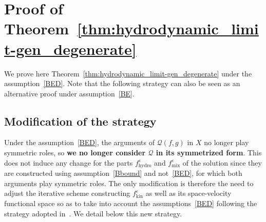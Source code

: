 \documentclass[10pt]{amsart}
\theoremstyle{definition}\newtheorem{defi}[theo]{Definition}\newtheorem{rema}[theo]{Remark}\newtheorem{exam}[theo]{Example}\newtheorem{exem}[theo]{Example}\newtheorem{nota}[theo]{Notation}
\newcommand{\hyd}{\mathrm{hydro}}
\newcommand{\mix}{\mathrm{mix}}
\newcommand{\kin}{\mathrm{kin}}
\newcommand{\QQ}{\mathcal{Q}}
\newcommand{\Sl}{X}
\newcommand*\eps{{\varepsilon}}
\begin{document}
\section{Proof of Theorem~\ref{thm:hydrodynamic_limit-gen_degenerate}}\label{scn:hydrodynamic_limit_BED}

We prove here Theorem~\ref{thm:hydrodynamic_limit-gen_degenerate} under the assumption~\eqref{BED}. Note that the following strategy can also be seen as an alternative proof under assumption~\eqref{BE}.

\subsection{Modification of the strategy} 

Under the assumption~\eqref{BED}, the arguments of $\QQ(f, g)$ in $\Sl$ no longer play symmetric roles, so \textbf{we no longer consider $\QQ$ in its symmetrized form}. This does not induce any change for the parts $f^\eps_\hyd$ and $f^\eps_\mix$ of the solution since they are constructed using assumption~\eqref{Bbound} and not~\eqref{BED}, for which both arguments play symmetric roles. The only modification is therefore the need to adjust the iterative scheme constructing $f^\eps_\kin$ as well as its space-velocity functional space so as to take into account the assumptions~\eqref{BED} following the strategy adopted in~\cite{CG2022,CM2017,CTW2016,GMM2017,HTT2020}. We detail below this new strategy.
\end{document}
